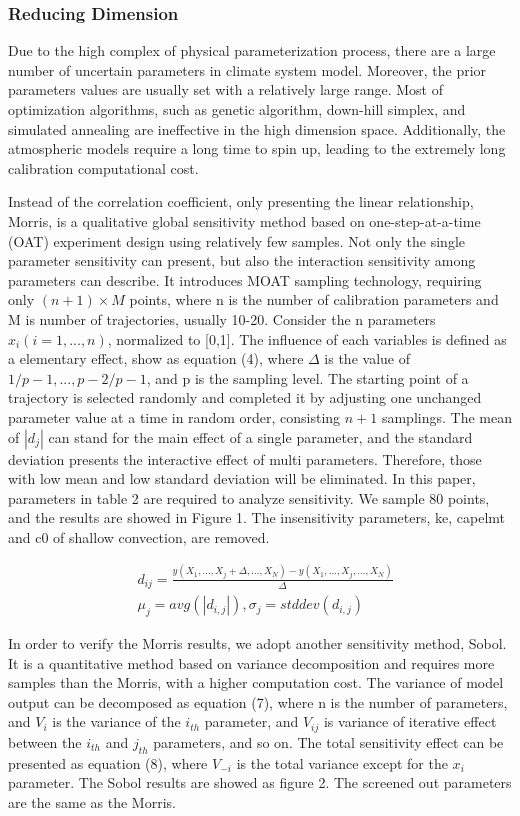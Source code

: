 \documentclass[gmd, manuscript]{copernicus}
\begin{document}
\subsubsection{Reducing Dimension}
Due to the high complex of physical parameterization process, there are a large number of uncertain
parameters in climate system model. Moreover, the prior parameters values are usually set with a
relatively large range. Most of optimization algorithms, such as genetic algorithm, down-hill
simplex, and simulated annealing are ineffective in the high dimension space. Additionally, the
atmospheric models require a long time to spin up, leading to the extremely long calibration
computational cost.

Instead of the correlation coefficient, only presenting the linear relationship, Morris, is a
qualitative global sensitivity  method based on one-step-at-a-time (OAT) experiment design using
relatively few samples. Not only the single parameter sensitivity can present, but also the
interaction sensitivity among parameters can describe. It introduces MOAT sampling technology,
requiring only $(n+1) \times M$ points, where n is the number of calibration parameters and M is
number of trajectories, usually 10-20. Consider the n parameters $x_i (i=1,...,n)$, normalized to
[0,1]. The influence of each variables is defined as a elementary effect, show as equation (4),
where $\Delta$ is the value of $1/p-1, ..., p-2/p-1$, and p is the sampling level. The starting
point of a trajectory is selected randomly and completed it by adjusting one unchanged parameter
value at a time in random order, consisting $n+1$ samplings. The mean of $|d_j|$ can stand for the
main effect of a single parameter, and the standard deviation presents the interactive effect of
multi parameters. Therefore, those with low mean and low standard deviation will be eliminated. In
this paper, parameters in table 2 are required to analyze sensitivity. We sample 80 points, and the
results are showed in Figure 1. The insensitivity parameters, ke, capelmt and c0 of shallow
convection, are removed.

\begin{align}
& d_{ij} = \frac{y(X_1,...,X_j+\Delta,...,X_N)-y(X_1,...,X_j,...,X_N)}{\Delta} \\
& \mu_j = avg(|d_{i,j}|), \sigma_j = stddev(d_{i,j}) 
\end{align}

In order to verify the Morris results, we adopt another sensitivity method, Sobol. It is a
quantitative method based on variance decomposition and requires more samples than the Morris, with
a higher computation cost. The variance of model output can be decomposed as equation (7), where n
is the number of parameters, and $V_i$ is the variance of the $i_{th}$ parameter, and $V_{ij}$ is
variance of iterative effect between the $i_{th}$ and $j_{th}$ parameters, and so on. The total
sensitivity effect can be presented as equation (8), where $V_{-i}$ is the total variance except
for the $x_i$ parameter. The Sobol results are showed as figure 2.  The screened out parameters are
the same as the Morris.
\end{document}
